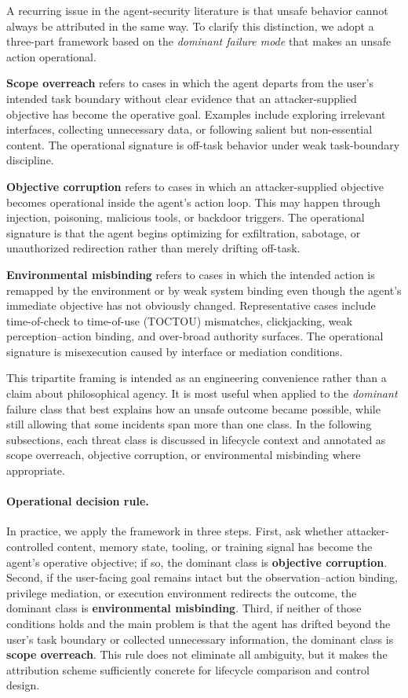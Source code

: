 A recurring issue in the agent-security literature is that unsafe behavior cannot always be attributed in the same way. To clarify this distinction, we adopt a three-part framework based on the \emph{dominant failure mode} that makes an unsafe action operational.

\textbf{Scope overreach} refers to cases in which the agent departs from the user’s intended task boundary without clear evidence that an attacker-supplied objective has become the operative goal. Examples include exploring irrelevant interfaces, collecting unnecessary data, or following salient but non-essential content. The operational signature is off-task behavior under weak task-boundary discipline.

\textbf{Objective corruption} refers to cases in which an attacker-supplied objective becomes operational inside the agent’s action loop. This may happen through injection, poisoning, malicious tools, or backdoor triggers. The operational signature is that the agent begins optimizing for exfiltration, sabotage, or unauthorized redirection rather than merely drifting off-task.

\textbf{Environmental misbinding} refers to cases in which the intended action is remapped by the environment or by weak system binding even though the agent’s immediate objective has not obviously changed. Representative cases include time-of-check to time-of-use (TOCTOU) mismatches, clickjacking, weak perception--action binding, and over-broad authority surfaces. The operational signature is misexecution caused by interface or mediation conditions.

This tripartite framing is intended as an engineering convenience rather than a claim about philosophical agency. It is most useful when applied to the \emph{dominant} failure class that best explains how an unsafe outcome became possible, while still allowing that some incidents span more than one class. In the following subsections, each threat class is discussed in lifecycle context and annotated as scope overreach, objective corruption, or environmental misbinding where appropriate.

\paragraph{Operational decision rule.}
In practice, we apply the framework in three steps. First, ask whether attacker-controlled content, memory state, tooling, or training signal has become the agent's operative objective; if so, the dominant class is \textbf{objective corruption}. Second, if the user-facing goal remains intact but the observation--action binding, privilege mediation, or execution environment redirects the outcome, the dominant class is \textbf{environmental misbinding}. Third, if neither of those conditions holds and the main problem is that the agent has drifted beyond the user's task boundary or collected unnecessary information, the dominant class is \textbf{scope overreach}. This rule does not eliminate all ambiguity, but it makes the attribution scheme sufficiently concrete for lifecycle comparison and control design.

